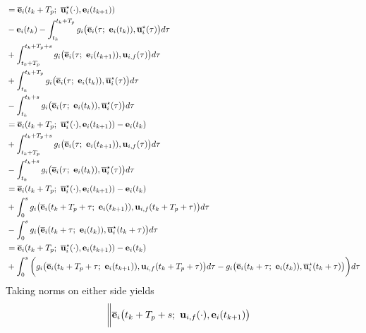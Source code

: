 \begin{bw_box}
\begin{alignat}{2}
    &= \overline{\vect{e}}_i(t_k + T_p;\ \overline{\vect{u}}_i^{\star}(\cdot), \vect{e}_i(t_{k+1})) \\
    &- \vect{e}_i(t_k) - \int_{t_k}^{t_k + T_p} g_i\big(\overline{\vect{e}}_i(\tau;\ \vect{e}_i(t_k)), \overline{\vect{u}}_i^{\star}(\tau)\big) d\tau\\
    &+ \int_{t_k + T_p}^{t_k + T_p + s} g_i\big(\overline{\vect{e}}_i(\tau;\ \vect{e}_i(t_{k+1})), \vect{u}_{i,f}(\tau)\big) d\tau \\
    &+ \int_{t_k}^{t_k + T_p} g_i\big(\overline{\vect{e}}_i(\tau;\ \vect{e}_i(t_k)), \overline{\vect{u}}_i^{\star}(\tau)\big) d\tau \\
    &- \int_{t_k}^{t_k + s} g_i\big(\overline{\vect{e}}_i(\tau;\ \vect{e}_i(t_k)), \overline{\vect{u}}_i^{\star}(\tau)\big) d\tau \\
    &= \overline{\vect{e}}_i(t_k + T_p;\ \overline{\vect{u}}_i^{\star}(\cdot), \vect{e}_i(t_{k+1})) - \vect{e}_i(t_k) \\
    &+ \int_{t_k + T_p}^{t_k + T_p + s} g_i\big(\overline{\vect{e}}_i(\tau;\ \vect{e}_i(t_{k+1})), \vect{u}_{i,f}(\tau)\big) d\tau \\
    &- \int_{t_k}^{t_k + s} g_i\big(\overline{\vect{e}}_i(\tau;\ \vect{e}_i(t_k)), \overline{\vect{u}}_i^{\star}(\tau)\big) d\tau \\
    &= \overline{\vect{e}}_i(t_k + T_p;\ \overline{\vect{u}}_i^{\star}(\cdot), \vect{e}_i(t_{k+1})) - \vect{e}_i(t_k) \\
    &+ \int_{0}^{s} g_i\big(\overline{\vect{e}}_i(t_k + T_p + \tau;\ \vect{e}_i(t_{k+1})), \vect{u}_{i,f}(t_k + T_p + \tau)\big) d\tau \\
    &- \int_{0}^{s} g_i\big(\overline{\vect{e}}_i(t_k + \tau;\ \vect{e}_i(t_k)), \overline{\vect{u}}_i^{\star}(t_k + \tau)\big) d\tau \\
    &= \overline{\vect{e}}_i(t_k + T_p;\ \overline{\vect{u}}_i^{\star}(\cdot), \vect{e}_i(t_{k+1})) - \vect{e}_i(t_k) \\
    &+ \int_{0}^{s} \bigg(g_i\big(\overline{\vect{e}}_i(t_k + T_p + \tau;\ \vect{e}_i(t_{k+1})), \vect{u}_{i,f}(t_k + T_p + \tau)\big) d\tau
    -  g_i\big(\overline{\vect{e}}_i(t_k + \tau;\ \vect{e}_i(t_k)), \overline{\vect{u}}_i^{\star}(t_k + \tau)\big) \bigg) d\tau \\
  \end{alignat}
  Taking norms on either side yields
  \begin{alignat}{2}
    &\bigg\| \overline{\vect{e}}_i\big(t_k + T_p + s;\ \vect{u}_{i,f}(\cdot), \vect{e}_i(t_{k+1})\big)

\end{alignat}
\end{bw_box}
